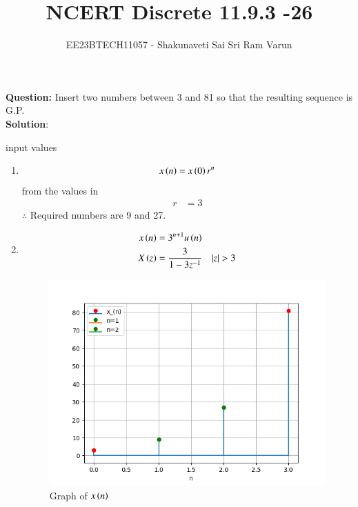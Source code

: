 \documentclass[journal,12pt,twocolumn]{IEEEtran}
\theoremstyle{remark}
\begin{document}

\vspace{3cm}

\title{NCERT Discrete 11.9.3 -26}
\author{EE23BTECH11057 - Shakunaveti Sai Sri Ram Varun$^{}$%
}
\maketitle
\newpage
\bigskip
\vspace{2cm}
\textbf{Question: }
Insert two numbers between 3 and 81 so that the resulting sequence is G.P.\\
\textbf{Solution}:\\
\begin{table}[htbp] 
\centering

\caption{input values}
\label{tab: Table 11.9.3.26.15}
\end{table}
\begin{enumerate}
\item 
\begin{align}
x\left(n\right)=x\left(0\right)r^{n}
\end{align}
from the values in 
\begin{align}
r&=3
\end{align}
$ \therefore $ Required numbers are 9 and 27.
\item 
\begin{align}
x\brak{n} &= 3^{n+1}u\brak{n} \label{eq:11.9.3.26.1}\\
X\brak{z} &= \frac{3}{1-3z^{-1}} \quad |z|>3 \label{eq:11.9.3.26.2}
\end{align}
\begin{figure}[h!]
    \includegraphics[width = \columnwidth]{figs/Figure_1.png}
    \caption{Graph of $ x\left(n\right)$ }
    \label{fig: 11.9.3.26.17}
\end{figure}
\end{enumerate}
\end{document}
